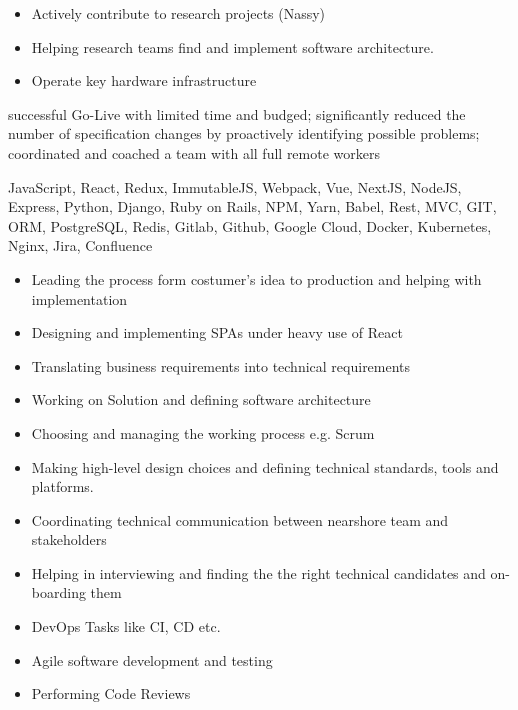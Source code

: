 \documentclass[9pt,a4paper]{altacv}
\begin{document}
%
\makebox[0pt][l]{%
  \hspace{-4cm}
  \raisebox{-\totalheight}[0pt][0pt]{%
   {\color{background}\fontsize{250}{48}\faRocket}
}}%

%


\begin{itemize}
\item Actively contribute to research projects (Nassy)
\item Helping research teams find and implement software architecture.
\item Operate key hardware infrastructure
\end{itemize}

successful Go-Live with limited time and budged;
significantly reduced the number of specification changes by proactively identifying possible problems;
coordinated and coached a team with all full remote workers

JavaScript, React, Redux, ImmutableJS, Webpack, Vue, NextJS, NodeJS, Express,
Python, Django, Ruby on Rails, NPM, Yarn, Babel,
Rest, MVC, GIT, ORM, PostgreSQL, Redis,
Gitlab, Github, Google Cloud, Docker, Kubernetes, Nginx,
Jira, Confluence

\divider

%


\begin{itemize}
\item Leading the process form costumer's idea to production and helping with implementation
\item Designing and implementing SPAs under heavy use of React
\item Translating business requirements into technical requirements
\item Working on Solution and defining software architecture
\item Choosing and managing the working process e.g. Scrum
\item Making high-level design choices and defining technical standards, tools and platforms.
\item Coordinating technical communication between nearshore team and stakeholders
\item Helping in interviewing and finding the the right technical candidates and on-boarding them
\item DevOps Tasks like CI, CD etc.
\item Agile software development and testing
\item Performing Code Reviews
\end{itemize}
\end{document}
